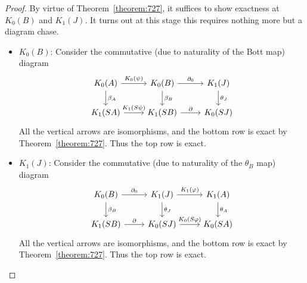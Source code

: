 \documentclass{book}
\begin{document}
\begin{proof}
  By virtue of Theorem~\ref{theorem:727}, it suffices to show exactness at \(K_0(B)\) and \(K_1(J)\).
  It turns out at this stage this requires nothing more but a diagram chase.\par
  \begin{itemize}
    \item \(K_0(B)\): Consider the commutative (due to naturality of the Bott map) diagram
    \begin{equation}\label{diag:8310}
    \begin{tikzcd}
      K_0(A)\arrow[r,"K_0(\psi)"]\arrow[d,"\beta_A"]&K_0(B)\arrow[r,"\partial_0"]\arrow[d,"\beta_B"]&K_1(J)\arrow[d,"\theta_J"]\\
      K_1(S A)\arrow[r,"K_1(S\psi)"]&K_1(S B)\arrow[r,"\partial"]&K_0(S J)
    \end{tikzcd}
  \end{equation}
  All the vertical arrows are isomorphisms, and the bottom row is exact by Theorem~\ref{theorem:727}.
  Thus the top row is exact.
  \item \(K_1(J)\): Consider the commutative (due to naturality of the \(\theta_B\) map) diagram
  \begin{equation}\label{diag:8311}
    \begin{tikzcd}
      K_0(B)\arrow[r,"\partial_0"]\arrow[d,"\beta_B"]&K_1(J)\arrow[r,"K_1(\varphi)"]\arrow[d,"\theta_J"]&K_1(A)\arrow[d,"\theta_A"]\\
      K_1(S B)\arrow[r,"\partial"]&K_0(S J)\arrow[r,"K_0(S\varphi)"]&K_0(S A)
    \end{tikzcd}
  \end{equation}
  All the vertical arrows are isomorphisms, and the bottom row is exact by Theorem~\ref{theorem:727}.
  Thus the top row is exact.
  \end{itemize}
\end{proof}
\end{document}
